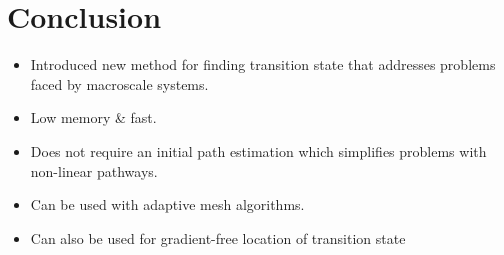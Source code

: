\documentclass[aps,twocolumn]{revtex4}
\begin{document}
\section{Conclusion}
\begin{itemize}
\item
Introduced new method for finding transition state that addresses problems faced by macroscale systems.
\item
Low memory \& fast.
\item
Does not require an initial path estimation which simplifies problems with non-linear pathways.
\item
Can be used with adaptive mesh algorithms.
\item
Can also be used for gradient-free location of transition state
\end{itemize}




\end{document}
